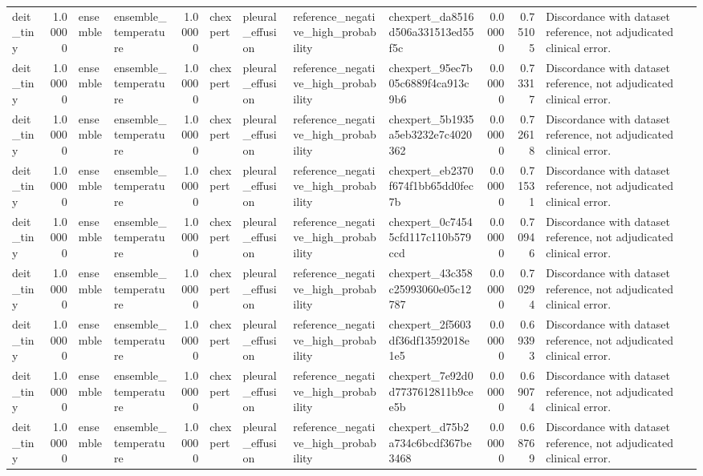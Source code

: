 \begin{tabular}{lrllrllllrrl}
deit\_tiny & 1.00000 & ensemble & ensemble\_temperature & 1.00000 & chexpert & pleural\_effusion & reference\_negative\_high\_probability & chexpert\_da8516d506a331513ed55f5c & 0.00000 & 0.75105 & Discordance with dataset reference, not adjudicated clinical error. \\
deit\_tiny & 1.00000 & ensemble & ensemble\_temperature & 1.00000 & chexpert & pleural\_effusion & reference\_negative\_high\_probability & chexpert\_95ec7b05c6889f4ca913c9b6 & 0.00000 & 0.73317 & Discordance with dataset reference, not adjudicated clinical error. \\
deit\_tiny & 1.00000 & ensemble & ensemble\_temperature & 1.00000 & chexpert & pleural\_effusion & reference\_negative\_high\_probability & chexpert\_5b1935a5eb3232e7c4020362 & 0.00000 & 0.72618 & Discordance with dataset reference, not adjudicated clinical error. \\
deit\_tiny & 1.00000 & ensemble & ensemble\_temperature & 1.00000 & chexpert & pleural\_effusion & reference\_negative\_high\_probability & chexpert\_eb2370f674f1bb65dd0fec7b & 0.00000 & 0.71531 & Discordance with dataset reference, not adjudicated clinical error. \\
deit\_tiny & 1.00000 & ensemble & ensemble\_temperature & 1.00000 & chexpert & pleural\_effusion & reference\_negative\_high\_probability & chexpert\_0c74545cfd117c110b579ccd & 0.00000 & 0.70946 & Discordance with dataset reference, not adjudicated clinical error. \\
deit\_tiny & 1.00000 & ensemble & ensemble\_temperature & 1.00000 & chexpert & pleural\_effusion & reference\_negative\_high\_probability & chexpert\_43c358c25993060e05c12787 & 0.00000 & 0.70294 & Discordance with dataset reference, not adjudicated clinical error. \\
deit\_tiny & 1.00000 & ensemble & ensemble\_temperature & 1.00000 & chexpert & pleural\_effusion & reference\_negative\_high\_probability & chexpert\_2f5603df36df13592018e1e5 & 0.00000 & 0.69393 & Discordance with dataset reference, not adjudicated clinical error. \\
deit\_tiny & 1.00000 & ensemble & ensemble\_temperature & 1.00000 & chexpert & pleural\_effusion & reference\_negative\_high\_probability & chexpert\_7e92d0d7737612811b9cee5b & 0.00000 & 0.69074 & Discordance with dataset reference, not adjudicated clinical error. \\
deit\_tiny & 1.00000 & ensemble & ensemble\_temperature & 1.00000 & chexpert & pleural\_effusion & reference\_negative\_high\_probability & chexpert\_d75b2a734c6bcdf367be3468 & 0.00000 & 0.68769 & Discordance with dataset reference, not adjudicated clinical error. \\

\end{tabular}
